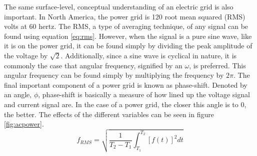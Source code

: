 \documentclass[journal]{IEEEtran}
\begin{document}
	The same surface-level, conceptual understanding of an electric grid is also important. In North America, the power grid is 120 root mean squared (RMS) volts at 60 hertz. The RMS, a type of averaging technique, of any signal can be found using equation \ref{eq:rms}. However, when the signal is a pure sine wave, like it is on the power grid, it can be found simply by dividing the peak amplitude of the voltage by $\sqrt{2}$. Additionally, since a sine wave is cyclical in nature, it is commonly the case that angular frequency, signified by an $\omega$, is preferred. This angular frequency can be found simply by multiplying the frequency by $2\pi$. The final important component of a power grid is known as phase-shift. Denoted by an angle, $\phi$, phase-shift is basically a measure of how lined up the voltage signal and current signal are. In the case of a power grid, the closer this angle is to 0, the better. The effects of the different variables can be seen in figure \ref{fig:acpower}.
	\begin{equation}
		\label{eq:rms}
		f_{RMS}=\sqrt{\frac{1}{T_2 - T_1}\int_{T_1}^{T_2}[f(t)] ^2 dt}
	\end{equation}
	
\end{document}
